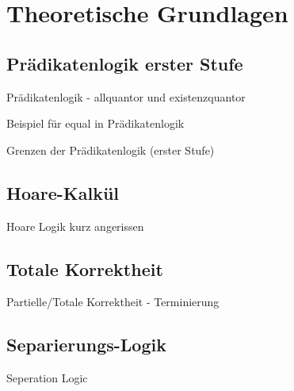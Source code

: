 ﻿
\chapter{Theoretische Grundlagen}

\section{Prädikatenlogik erster Stufe}

Prädikatenlogik - allquantor und existenzquantor


Beispiel für equal in Prädikatenlogik


Grenzen der Prädikatenlogik (erster Stufe)

\section{Hoare-Kalkül}

Hoare Logik kurz angerissen


\section{Totale Korrektheit}

Partielle/Totale Korrektheit - Terminierung

\section{Separierungs-Logik}


Seperation Logic
